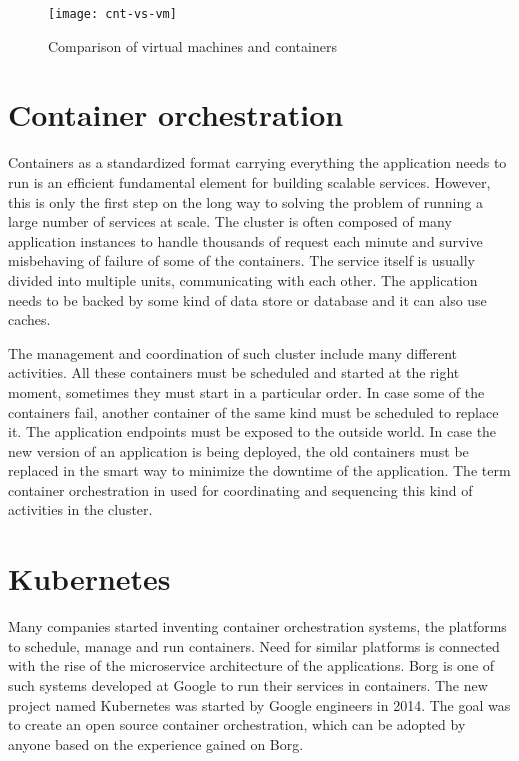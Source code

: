 \documentclass[
  digital, %
  twoside, %
  table,   %
  nolof,   %
  nolot,   %
]{fithesis3}
\begin{document}
\begin{figure}[H]
\caption{Comparison of virtual machines and containers}
\centering
\texttt{[image: cnt-vs-vm]}
\label{fig:cnt-vs-vm}
\end{figure}

\section{Container orchestration} \label{sec:orchestration}
Containers as a standardized format carrying everything the application needs to run is an efficient fundamental element for building scalable services. However, this is only the first step on the long way to solving the problem of running a large number of services at scale. The cluster is often composed of many application instances to handle thousands of request each minute and survive misbehaving of failure of some of the containers. The service itself is usually divided into multiple units, communicating with each other. The application needs to be backed by some kind of data store or database and it can also use caches.

The management and coordination of such cluster include many different activities. All these containers must be scheduled and started at the right moment, sometimes they must start in a particular order. In case some of the containers fail, another container of the same kind must be scheduled to replace it. The application endpoints must be exposed to the outside world. In case the new version of an application is being deployed, the old containers must be replaced in the smart way to minimize the downtime of the application. The term container orchestration in used for coordinating and sequencing this kind of activities in the cluster.

\section{Kubernetes} \label{sec:k8s}
Many companies started inventing container orchestration systems, the platforms to schedule, manage and run containers. Need for similar platforms is connected with the rise of the microservice architecture of the applications. Borg \cite{borg} is one of such systems developed at Google to run their services in containers. The new project named Kubernetes was started by Google engineers in 2014. The goal was to create an open source container orchestration, which can be adopted by anyone based on the experience gained on Borg.
\end{document}
